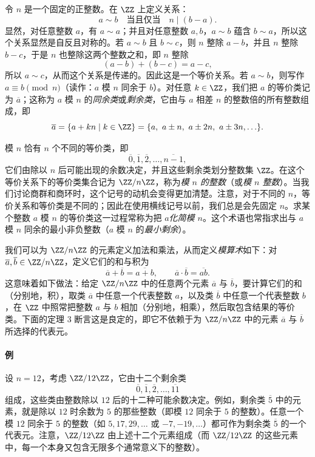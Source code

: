 令 $n$ 是一个固定的正整数。在 $\ZZ$ 上定义关系：
\[
  a\sim b\quad\text{当且仅当}\quad n\mid(b-a).
\]
显然，对任意整数 $a$，有 $a\sim a$；并且对任意整数 $a,b$，$a\sim b$ 蕴含 $b\sim a$，所以这个关系显然是自反且对称的。若 $a\sim b$ 且 $b\sim c$，则 $n$ 整除 $a-b$，并且 $n$ 整除 $b-c$，于是 $n$ 也整除这两个整数之和，即 $n$ 整除
\[
  (a-b)+(b-c)=a-c,
\]
所以 $a\sim c$，从而这个关系是传递的。因此这是一个等价关系。若 $a\sim b$，则写作 $a\equiv b\pmod n$（读作：$a$ 模 $n$ 同余于 $b$）。对任意 $k\in\ZZ$，我们把 $a$ 的等价类记为 $\overline{a}$；这称为 $a$ 模 $n$ 的\emph{同余类}或\emph{剩余类}，它由与 $a$ 相差 $n$ 的整数倍的所有整数组成，即
\[
  \overline{a}=\{a+kn\mid k\in\ZZ\}
  =\{a,\ a\pm n,\ a\pm2n,\ a\pm3n,\ldots\}.
\]

模 $n$ 恰有 $n$ 个不同的等价类，即
\[
  \overline{0},\overline{1},\overline{2},\ldots,\overline{n-1},
\]
它们由除以 $n$ 后可能出现的余数决定，并且这些剩余类划分整数集 $\ZZ$。在这个等价关系下的等价类集合记为 $\ZZ/n\ZZ$，称为\emph{模 $n$ 的整数}（或\emph{模 $n$ 整数}）。当我们讨论商群和商环时，这个记号的动机会变得更加清楚。注意，对于不同的 $n$，等价关系和等价类是不同的；因此在使用横线记号以前，我们总是会先固定 $n$。求某个整数 $a$ 模 $n$ 的等价类这一过程常称为把 $a$\emph{化简模 $n$}。这个术语也常指求出与 $a$ 模 $n$ 同余的最小非负整数（$a$ 模 $n$ 的\emph{最小剩余}）。

我们可以为 $\ZZ/n\ZZ$ 的元素定义加法和乘法，从而定义\emph{模算术}如下：对 $\overline{a},\overline{b}\in\ZZ/n\ZZ$，定义它们的和与积为
\[
  \overline{a}+\overline{b}=\overline{a+b},
  \qquad
  \overline{a}\cdot\overline{b}=\overline{ab}.
\]
这意味着如下做法：给定 $\ZZ/n\ZZ$ 中的任意两个元素 $\overline{a}$ 与 $\overline{b}$，要计算它们的和（分别地，积），取类 $\overline{a}$ 中任意一个代表整数 $a$，以及类 $\overline{b}$ 中任意一个代表整数 $b$，在 $\ZZ$ 中照常把整数 $a$ 与 $b$ 相加（分别地，相乘），然后取包含结果的等价类。下面的定理 3 断言这是良定的，即它不依赖于为 $\ZZ/n\ZZ$ 中的元素 $\overline{a}$ 与 $\overline{b}$ 所选择的代表元。

\paragraph{例}
设 $n=12$，考虑 $\ZZ/12\ZZ$，它由十二个剩余类
\[
  \overline{0},\overline{1},\overline{2},\ldots,\overline{11}
\]
组成，这些类由整数除以 $12$ 后的十二种可能余数决定。例如，剩余类 $\overline{5}$ 中的元素，就是除以 $12$ 时余数为 $5$ 的那些整数（即模 $12$ 同余于 $5$ 的整数）。任意一个模 $12$ 同余于 $5$ 的整数（如 $5,17,29,\ldots$ 或 $-7,-19,\ldots$）都可作为剩余类 $\overline{5}$ 的一个代表元。注意，$\ZZ/12\ZZ$ 由上述十二个元素组成（而 $\ZZ/12\ZZ$ 的这些元素中，每一个本身又包含无限多个通常意义下的整数）。

